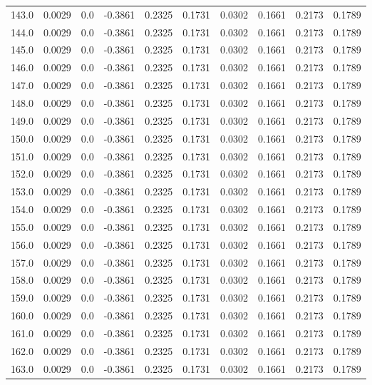 \begin{longtable}{lrrrrrrrrr}
143.0 & 0.0029 & 0.0 & -0.3861 & 0.2325 & 0.1731 & 0.0302 & 0.1661 & 0.2173 & 0.1789 \\
144.0 & 0.0029 & 0.0 & -0.3861 & 0.2325 & 0.1731 & 0.0302 & 0.1661 & 0.2173 & 0.1789 \\
145.0 & 0.0029 & 0.0 & -0.3861 & 0.2325 & 0.1731 & 0.0302 & 0.1661 & 0.2173 & 0.1789 \\
146.0 & 0.0029 & 0.0 & -0.3861 & 0.2325 & 0.1731 & 0.0302 & 0.1661 & 0.2173 & 0.1789 \\
147.0 & 0.0029 & 0.0 & -0.3861 & 0.2325 & 0.1731 & 0.0302 & 0.1661 & 0.2173 & 0.1789 \\
148.0 & 0.0029 & 0.0 & -0.3861 & 0.2325 & 0.1731 & 0.0302 & 0.1661 & 0.2173 & 0.1789 \\
149.0 & 0.0029 & 0.0 & -0.3861 & 0.2325 & 0.1731 & 0.0302 & 0.1661 & 0.2173 & 0.1789 \\
150.0 & 0.0029 & 0.0 & -0.3861 & 0.2325 & 0.1731 & 0.0302 & 0.1661 & 0.2173 & 0.1789 \\
151.0 & 0.0029 & 0.0 & -0.3861 & 0.2325 & 0.1731 & 0.0302 & 0.1661 & 0.2173 & 0.1789 \\
152.0 & 0.0029 & 0.0 & -0.3861 & 0.2325 & 0.1731 & 0.0302 & 0.1661 & 0.2173 & 0.1789 \\
153.0 & 0.0029 & 0.0 & -0.3861 & 0.2325 & 0.1731 & 0.0302 & 0.1661 & 0.2173 & 0.1789 \\
154.0 & 0.0029 & 0.0 & -0.3861 & 0.2325 & 0.1731 & 0.0302 & 0.1661 & 0.2173 & 0.1789 \\
155.0 & 0.0029 & 0.0 & -0.3861 & 0.2325 & 0.1731 & 0.0302 & 0.1661 & 0.2173 & 0.1789 \\
156.0 & 0.0029 & 0.0 & -0.3861 & 0.2325 & 0.1731 & 0.0302 & 0.1661 & 0.2173 & 0.1789 \\
157.0 & 0.0029 & 0.0 & -0.3861 & 0.2325 & 0.1731 & 0.0302 & 0.1661 & 0.2173 & 0.1789 \\
158.0 & 0.0029 & 0.0 & -0.3861 & 0.2325 & 0.1731 & 0.0302 & 0.1661 & 0.2173 & 0.1789 \\
159.0 & 0.0029 & 0.0 & -0.3861 & 0.2325 & 0.1731 & 0.0302 & 0.1661 & 0.2173 & 0.1789 \\
160.0 & 0.0029 & 0.0 & -0.3861 & 0.2325 & 0.1731 & 0.0302 & 0.1661 & 0.2173 & 0.1789 \\
161.0 & 0.0029 & 0.0 & -0.3861 & 0.2325 & 0.1731 & 0.0302 & 0.1661 & 0.2173 & 0.1789 \\
162.0 & 0.0029 & 0.0 & -0.3861 & 0.2325 & 0.1731 & 0.0302 & 0.1661 & 0.2173 & 0.1789 \\
163.0 & 0.0029 & 0.0 & -0.3861 & 0.2325 & 0.1731 & 0.0302 & 0.1661 & 0.2173 & 0.1789 \\

\end{longtable}

